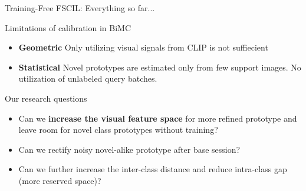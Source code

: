 \documentclass[aspectratio=169,10pt]{beamer}
\begin{document}
\begin{frame}{Training-Free FSCIL: Everything so far...}
        \centering
        \begin{block}{Limitations of calibration in BiMC}
        \begin{itemize}
            \item \textbf{Geometric} Only utilizing visual signals from CLIP is not suffiecient 
            \item \textbf{Statistical} Novel prototypes are estimated only from few support images. No utilization of unlabeled query batches.
        \end{itemize}
        \end{block}

        \vspace{2.5em}

        \centering
        \begin{block}{Our research questions}
            \begin{itemize}
                \item Can we \textbf{increase the visual feature space} for more refined prototype and leave room for novel class prototypes without training?
                \item Can we rectify noisy novel-alike prototype after base session?
                \item Can we further increase the inter-class distance and reduce intra-class gap (more reserved space)? 
            \end{itemize}
        \end{block}
\end{frame}



\end{document}
